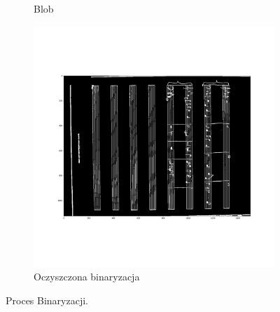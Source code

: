 \documentclass[12pt]{article}
\begin{document}
\begin{figure}[h!]
\begin{subfigure}[b]{0.32\linewidth}
			\caption{Blob}
		\end{subfigure}
		\begin{subfigure}[b]{0.32\linewidth}
			\includegraphics[width=\linewidth]{zdj/Bin2.png}
			\caption{Oczyszczona binaryzacja}
		\end{subfigure}
		\caption{Proces Binaryzacji.}
		\label{fig:binary}
	\end{figure}
\end{document}
